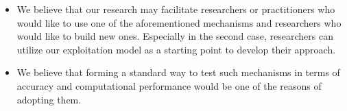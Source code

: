 \documentclass[conference]{IEEEtran}
\begin{document}
\begin{itemize}
\item We believe that our research may facilitate researchers
or practitioners who would like to use one of the
aforementioned mechanisms and researchers who would like
to build new ones. Especially in the second case,
researchers can utilize our exploitation model as a
starting point to develop their approach.
\item We believe that forming a
standard way to test such mechanisms in terms
of accuracy and computational performance
would be one of the reasons of adopting them.
\end{itemize}



\end{document}
